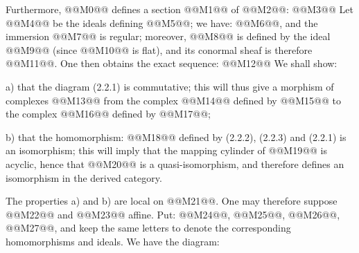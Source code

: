 Furthermore,
@@M0@@ defines a section @@M1@@ of @@M2@@:
@@M3@@
Let @@M4@@ be the ideals defining @@M5@@; we have: @@M6@@, and the immersion @@M7@@ is regular; moreover, @@M8@@ is defined by the ideal @@M9@@ (since @@M10@@ is flat), and its conormal sheaf is therefore @@M11@@. One then obtains the exact sequence:
@@M12@@
We shall show:

a) that the diagram (2.2.1) is commutative; this will thus give a morphism of complexes @@M13@@ from the complex @@M14@@ defined by @@M15@@ to the complex @@M16@@ defined by @@M17@@;

b) that the homomorphism: @@M18@@ defined by (2.2.2), (2.2.3) and (2.2.1) is an isomorphism; this will imply that the mapping cylinder of @@M19@@ is acyclic, hence that @@M20@@ is a quasi-isomorphism, and therefore defines an isomorphism in the derived category.

The properties a) and b) are local on @@M21@@. One may therefore suppose @@M22@@ and @@M23@@ affine. Put: @@M24@@, @@M25@@, @@M26@@, @@M27@@, and keep the same letters to denote the corresponding homomorphisms and ideals. We have the diagram:
